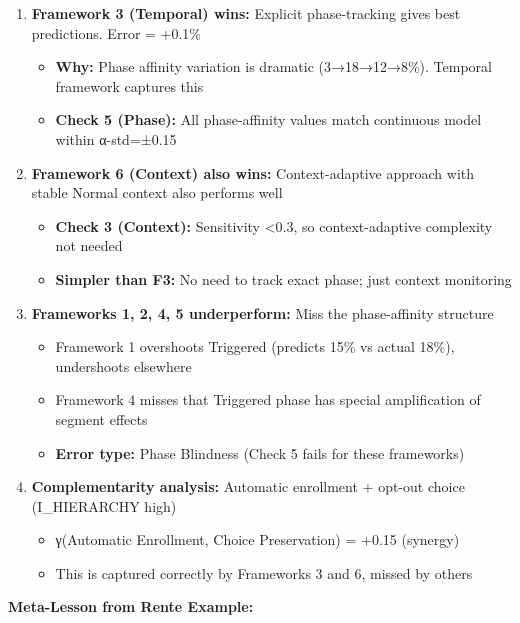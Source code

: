 \begin{enumerate}
\item \textbf{Framework 3 (Temporal) wins:} Explicit phase-tracking gives best predictions. Error = +0.1\%
  \begin{itemize}[nosep]
  \item \textbf{Why:} Phase affinity variation is dramatic (3→18→12→8\%). Temporal framework captures this
  \item \textbf{Check 5 (Phase):} All phase-affinity values match continuous model within α-std=±0.15
  \end{itemize}

\item \textbf{Framework 6 (Context) also wins:} Context-adaptive approach with stable Normal context also performs well
  \begin{itemize}[nosep]
  \item \textbf{Check 3 (Context):} Sensitivity <0.3, so context-adaptive complexity not needed
  \item \textbf{Simpler than F3:} No need to track exact phase; just context monitoring
  \end{itemize}

\item \textbf{Frameworks 1, 2, 4, 5 underperform:} Miss the phase-affinity structure
  \begin{itemize}[nosep]
  \item Framework 1 overshoots Triggered (predicts 15\% vs actual 18\%), undershoots elsewhere
  \item Framework 4 misses that Triggered phase has special amplification of segment effects
  \item \textbf{Error type:} Phase Blindness (Check 5 fails for these frameworks)
  \end{itemize}

\item \textbf{Complementarity analysis:} Automatic enrollment + opt-out choice (I\_HIERARCHY high)
  \begin{itemize}[nosep]
  \item γ(Automatic Enrollment, Choice Preservation) = +0.15 (synergy)
  \item This is captured correctly by Frameworks 3 and 6, missed by others
  \end{itemize}

\end{enumerate}

\textbf{Meta-Lesson from Rente Example:}

